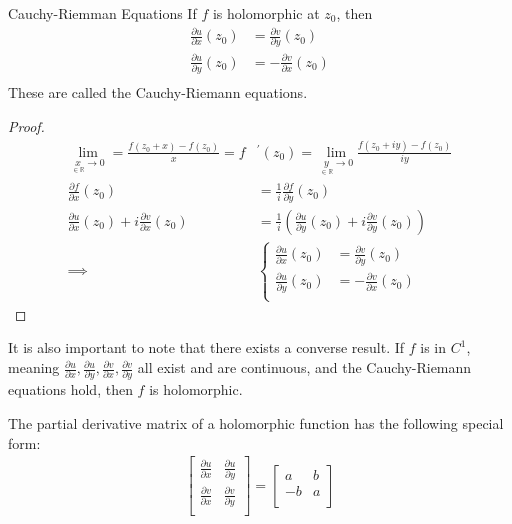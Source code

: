 \documentclass{article}
\begin{document}
\begin{thrm}{Cauchy-Riemman Equations}{}
If \( f \) is holomorphic at \( z _0 \), then 
\begin{align*}
    \frac{\partial u}{\partial x}(z_0) &= \frac{\partial v}{\partial y}(z_0) \\
    \frac{\partial u}{\partial y}(z_0) &= - \frac{\partial v}{\partial x}(z_0) \\
\end{align*}
These are called the Cauchy-Riemann equations. 
    \tcbline

    \begin{proof}
    \begin{align*}
        \lim_{{\underset{\in \mathbb{R}}{x}  \to 0}} = \frac{f(z_0 + x)- f(z_0)}{x} = f& ^\prime(z_0) = \lim_{\underset{\in \mathbb{R} }{y}  \to 0} \frac{f(z_0+ iy) - f(z_0)}{iy} \\ 
        \frac{\partial f}{\partial x}(z_0) &= \frac{1}{i}\frac{\partial f }{\partial y}(z_0) \\
        \frac{\partial u}{\partial x} (z_0) + i \frac{\partial v}{\partial x} (z_0) &= \frac{1}{i}(\frac{\partial u}{\partial y} (z_0) + i\frac{\partial v}{\partial y} (z_0))  \\
        \implies  &\begin{cases}
        \frac{\partial u}{\partial x}(z_0) &= \frac{\partial v}{\partial y}(z_0) \\
        \frac{\partial u}{\partial y}(z_0) &= - \frac{\partial v}{\partial x}(z_0) \\
        \end{cases}
    \end{align*}
    
    \end{proof}
    \tcbline

    It is also important to note that there exists a converse result. If \( f \) is in \( C^1 \), meaning \( \frac{\partial u}{\partial x} , \frac{\partial u}{\partial y} , \frac{\partial v}{\partial x} , \frac{\partial v}{\partial y}  \) all exist and are continuous, and the Cauchy-Riemann equations hold, then \(  f \) is holomorphic. 
\end{thrm}

The partial derivative matrix of a holomorphic function has the following special form:
\begin{align*}
    \begin{bmatrix}
        \frac{\partial u}{\partial x}  & \frac{\partial u}{\partial y}   \\
         \frac{\partial v}{\partial x} &  \frac{\partial v}{\partial y}  \\
    \end{bmatrix} = \begin{bmatrix}
        a &   b \\
        -b &  a \\
    \end{bmatrix}
\end{align*}
\end{document}
